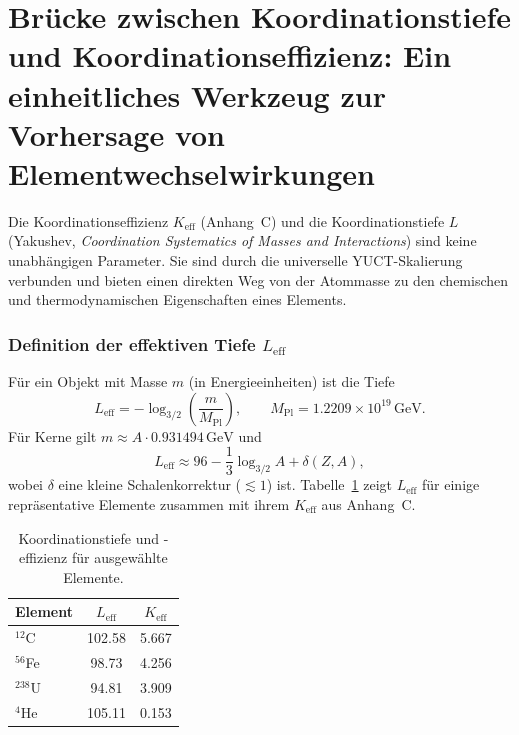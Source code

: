\documentclass[12pt,a4paper]{article}
\theoremstyle{remark}
\begin{document}
	\section{Brücke zwischen Koordinationstiefe und Koordinationseffizienz: Ein einheitliches Werkzeug zur Vorhersage von Elementwechselwirkungen}
	\label{subsec:bridge}
	
	Die Koordinationseffizienz \(K_{\mathrm{eff}}\) (Anhang~C) und die Koordinationstiefe \(L\) (Yakushev, \textit{Coordination Systematics of Masses and Interactions}\cite{YKmass}) sind keine unabhängigen Parameter.  
	Sie sind durch die universelle YUCT-Skalierung verbunden und bieten einen direkten Weg von der Atommasse zu den chemischen und thermodynamischen Eigenschaften eines Elements.
	
	\subsubsection{Definition der effektiven Tiefe \(L_{\mathrm{eff}}\)}
	Für ein Objekt mit Masse \(m\) (in Energieeinheiten) ist die Tiefe
	\begin{equation}
		L_{\mathrm{eff}} = -\log_{3/2}\!\left(\frac{m}{M_{\mathrm{Pl}}}\right),
		\qquad M_{\mathrm{Pl}} = 1.2209\times10^{19}\,\text{GeV}.
	\end{equation}
	Für Kerne gilt \(m \approx A \cdot 0.931494\,\text{GeV}\) und
	\begin{equation}
		L_{\mathrm{eff}} \approx 96 - \frac{1}{3}\log_{3/2}A + \delta(Z,A),
	\end{equation}
	wobei \(\delta\) eine kleine Schalenkorrektur (\(\lesssim 1\)) ist.  
	Tabelle~\ref{tab:L_Keff} zeigt \(L_{\mathrm{eff}}\) für einige repräsentative Elemente zusammen mit ihrem \(K_{\mathrm{eff}}\) aus Anhang~C.
	
	\begin{table}[htbp]
		\centering
		\caption{Koordinationstiefe und -effizienz für ausgewählte Elemente.}
		\label{tab:L_Keff}
		\begin{tabular}{@{}lcc@{}}
			\toprule
			Element & \(L_{\mathrm{eff}}\) & \(K_{\mathrm{eff}}\) \\
			\midrule
			$^{12}$C & 102.58 & 5.667 \\
			$^{56}$Fe & 98.73 & 4.256 \\
			$^{238}$U & 94.81 & 3.909 \\
			$^{4}$He & 105.11 & 0.153 \\
			\bottomrule
		\end{tabular}
	\end{table}
	
\end{document}
